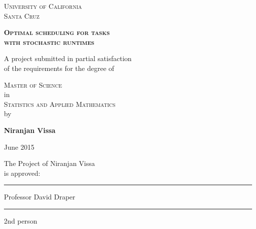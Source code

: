 \documentclass[12pt]{report}
\begin{document}
\begin{titlepage}
\begin{center}

\textsc{\Large University of California \\
Santa Cruz } \\
\vspace*{0.15in}

\textsc{\Large \textbf{Optimal scheduling for tasks \\
with stochastic runtimes}}
\vspace*{0.15in}

\large
A project submitted in partial satisfaction \vspace*{-0.1in} \\
of the requirements for the degree of \\
\vspace*{0.15in}

\textsc{\Large Master of Science} \\
\large in \\

\textsc{\Large Statistics and Applied Mathematics} \\
\large by \\
\vspace*{0.15in}

\textbf{Niranjan Vissa} \\
\vspace*{0.15in}

June 2015
\large
\vspace*{0.15in}

\begin{flushright}

The Project of Niranjan Vissa \\
is approved:
\vspace*{-0.1in}
\vspace*{0.2in}

\rule{2.5in}{.01cm}

Professor David Draper

\vspace*{0.2in}

\rule{2.5in}{.01cm}

2nd person

\end{flushright}

\end{center}
\end{titlepage}


\end{document}
